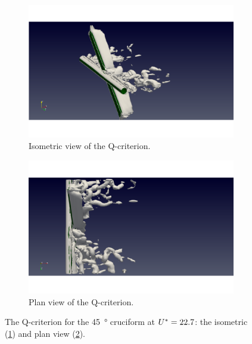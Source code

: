 \documentclass[oneside]{utmthesis}
\begin{document}
\begin{figure}
  \centering
  \begin{subfigure}[h]{0.9\textwidth}
    \includegraphics[width=\textwidth]{figs/qIso045U10}
    \caption{Isometric view of the Q-criterion.}
    \label{fig:qIso045U10}
  \end{subfigure}

  \begin{subfigure}[h]{0.9\textwidth}
    \includegraphics[width=\textwidth]{figs/qTop045U10}
    \caption{Plan view of the Q-criterion.}
    \label{fig:qTop045U10}
  \end{subfigure}

  \caption{The Q-criterion for the \SI{45}{\degree} cruciform at $U^{*} = 22.7$: the isometric (\ref{fig:qIso045U10}) and plan view (\ref{fig:qTop045U10}).} \label{fig:qCrit045U10}
\end{figure}
\end{document}
